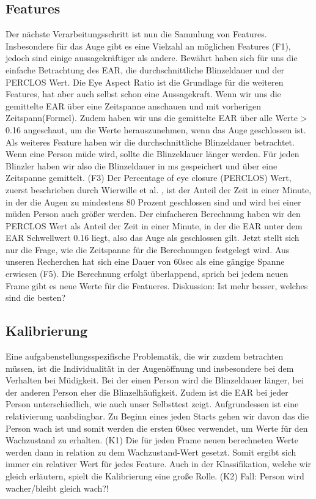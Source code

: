 \subsection{Features}
\label{sec:features}
Der nächste Verarbeitungsschritt ist nun die Sammlung von Features. Insbesondere für das Auge gibt es eine Vielzahl an möglichen Features (F1), jedoch sind einige aussagekräftiger als andere. Bewährt haben sich für uns die einfache Betrachtung des EAR, die durchschnittliche Blinzeldauer und der PERCLOS Wert.
Die Eye Aspect Ratio ist die Grundlage für die weiteren Features, hat aber auch selbst schon eine Aussagekraft. Wenn wir uns die gemittelte EAR über eine Zeitspanne anschauen und mit vorherigen Zeitspann(Formel). Zudem haben wir uns die gemittelte EAR über alle Werte > 0.16 angeschaut, um die Werte herauszunehmen, wenn das Auge geschlossen ist.
Als weiteres Feature haben wir die durchschnittliche Blinzeldauer betrachtet. Wenn eine Person müde wird, sollte die Blinzeldauer länger werden. Für jeden Blinzler haben wir also die Blinzeldauer in ms gespeichert und über eine Zeitspanne gemittelt. (F3)
Der Percentage of eye closure (PERCLOS) Wert, zuerst beschrieben durch Wierwille et al.
\cite{WI94}, ist der Anteil der Zeit in einer Minute, in der die Augen zu mindestens 80 Prozent geschlossen sind und wird bei einer müden Person auch größer werden. Der einfacheren Berechnung haben wir den PERCLOS Wert als Anteil der Zeit in einer Minute, in der die EAR unter dem EAR Schwellwert 0.16 liegt, also das Auge als geschlossen gilt.
Jetzt stellt sich nur die Frage, wie die Zeitspanne für die Berechnungen festgelegt wird. Aus unseren Recherchen hat sich eine Dauer von 60sec als eine gängige Spanne erwiesen (F5). Die Berechnung erfolgt überlappend, sprich bei jedem neuen Frame gibt es neue Werte für die Featueres.
Diskussion: Ist mehr besser, welches sind die besten?

\subsection{Kalibrierung}
\label{sec:calibration}
Eine aufgabenstellungsspezifische Problematik, die wir zuzdem betrachten müssen, ist die Individualität in der Augenöffnung und insbesondere bei dem Verhalten bei Müdigkeit. Bei der einen Person wird die Blinzeldauer länger, bei der anderen Person eher die Blinzelhäufigkeit. Zudem ist die EAR bei jeder Person unterschiedlich, wie auch unser Selbsttest zeigt. Aufgrundessen ist eine relativierung uanbdingbar. Zu Beginn eines jeden Starts gehen wir davon das die Person wach ist und somit werden die ersten 60sec verwendet, um Werte für den Wachzustand zu erhalten. (K1) Die für jeden Frame neuen berechneten Werte werden dann in relation zu dem Wachzustand-Wert gesetzt. Somit ergibt sich immer ein relativer Wert für jedes Feature. Auch in der Klassifikation, welche wir gleich erläutern, spielt die Kalibrierung eine große Rolle. (K2) Fall: Person wird wacher/bleibt gleich wach?!

